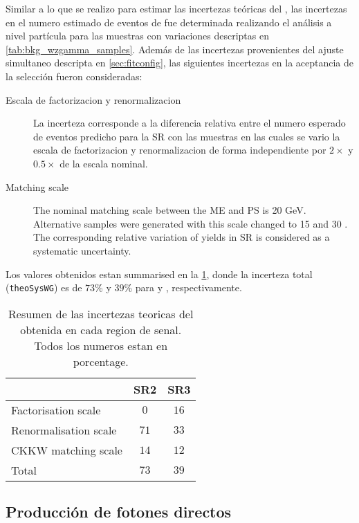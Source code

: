 Similar a lo que se realizo para estimar las incertezas teóricas del {\ttgam}, las incertezas
en el numero estimado de eventos de {\wgam} fue determinada realizando el análisis a nivel
partícula para las muestras con variaciones descriptas en \cref{tab:bkg_wzgamma_samples}.
Además de las incertezas provenientes del ajuste simultaneo descripta en \cref{sec:fitconfig},
las siguientes incertezas en la aceptancia de la selección fueron consideradas:

\begin{description}
\item[Escala de factorizacion y renormalizacion] La incerteza corresponde
  a la diferencia relativa entre el numero esperado de eventos predicho
  para la SR con las muestras {\sherpa} en las cuales se vario la escala
  de factorizacion y renormalizacion de forma independiente por $2\times$
  y $0.5\times$ de la escala nominal.

\item[Matching scale] The nominal matching scale between the ME and PS is 20 GeV. Alternative samples
  were generated with this scale changed to 15 and 30 \gev. The corresponding
  relative variation of yields in SR is considered as a systematic uncertainty.
\end{description}

Los valores obtenidos estan summarised en la \cref{tab:syst_wgamma_truth},
donde la incerteza total (\texttt{theoSysWG}) es de  $73$\% y $39$\% para {\SRL} y
{\SRH}, respectivamente.

\begin{table}[ht!]
  \centering
  \begin{tabular}{ l | c  c  }
    \hline
    & SR2 & SR3 \\
    \hline
    Factorisation scale   & $0$  & $16$ \\
    Renormalisation scale & $71$ & $33$ \\
    CKKW matching scale   & $14$ & $12$ \\
    \hline
    \hline
    Total  &   $73$    &  $39$     \\
    \hline
  \end{tabular}
  \caption{Resumen de las incertezas teoricas del {\wgam} obtenida en cada region de senal.
    Todos los numeros estan en porcentage.}
  \label{tab:syst_wgamma_truth}
\end{table}



\subsection{Producción de fotones directos}


